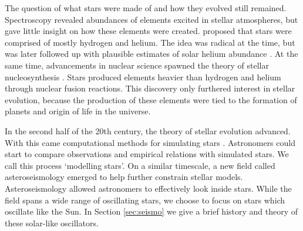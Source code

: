 



The question of what stars were made of and how they evolved still remained. Spectroscopy revealed abundances of elements excited in stellar atmospheres, but gave little insight on how these elements were created. \citet{Payne1925} proposed that stars were comprised of mostly hydrogen and helium. The idea was radical at the time, but was later followed up with plausible estimates of solar helium abundance \citep[e.g.][]{Schwarzschild1946}. At the same time, advancements in nuclear science spawned the theory of stellar nucleosynthesis \citep{Hoyle1946}. Stars produced elements heavier than hydrogen and helium through nuclear fusion reactions. This discovery only furthered interest in stellar evolution, because the production of these elements were tied to the formation of planets and origin of life in the universe.

In the second half of the 20th century, the theory of stellar evolution advanced. With this came computational methods for simulating stars \citep[e.g.][]{Kippenhahn.Weigert.ea1967}. Astronomers could start to compare observations and empirical relations with simulated stars. We call this process `modelling stars'. On a similar timescale, a new field called asteroseismology emerged to help further constrain stellar models. Asteroseismology allowed astronomers to effectively look inside stars. While the field spans a wide range of oscillating stars, we choose to focus on stars which oscillate like the Sun. In Section \ref{sec:seismo} we give a brief history and theory of these solar-like oscillators.

